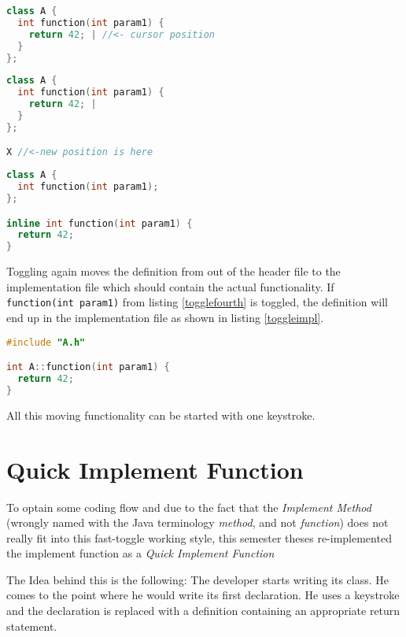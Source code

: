 \begin{lstlisting}[caption={Startposition of toggling},
label={togglefirst}, language=C++]
class A {
  int function(int param1) {
    return 42; | //<- cursor position
  }
};
\end{lstlisting}

\begin{lstlisting}[caption={New position is found},
label={togglethird}, language=C++]
class A {
  int function(int param1) {
    return 42; |
  }
};

X //<-new position is here
\end{lstlisting}

\begin{lstlisting}[caption={Class with declaration and inlined definition},
label={togglefourth}, language=C++]
class A {
  int function(int param1);
};

inline int function(int param1) {
  return 42;
}
\end{lstlisting}

Toggling again moves the definition from out of the header file to the
implementation file which should contain the actual functionality. If
\texttt{function(int param1)} from listing \ref{togglefourth} is toggled,
the definition will end up in the implementation file as shown in listing
\ref{toggleimpl}.

\begin{lstlisting}[caption={defintion in a implementation file},
label={toggleimpl}, language=C++]
#include "A.h"

int A::function(int param1) {
  return 42;
}
\end{lstlisting}

All this moving functionality can be started with one keystroke.

\section*{Quick Implement Function}

To optain some coding flow and due to the fact that the \textit{Implement
Method} (wrongly named with the Java terminology \textit{method}, and not \textit{function}) does
not really fit into this fast-toggle working style, this semester theses
re-implemented the implement function as a \textit{Quick Implement Function}

The Idea behind this is the following: The developer starts writing its class.
He comes to the point where he would write its first declaration. He uses a
keystroke and the declaration is replaced with a definition containing an
appropriate return statement.

